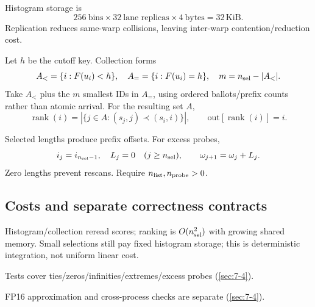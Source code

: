 Histogram storage is
\[
 256\ \text{bins}\times32\ \text{lane replicas}\times4\ \text{bytes}=32\,\mathrm{KiB}.
\]
Replication reduces same-warp collisions, leaving inter-warp contention/reduction cost.

Let $h$ be the cutoff key. Collection forms
\[
 A_< =\{i:F(u_i)<h\},\quad A_= =\{i:F(u_i)=h\},\quad
 m=n_{\rm sel}-|A_<|.
\]
Take $A_<$ plus the $m$ smallest IDs in $A_=$, using ordered ballots/prefix counts rather than atomic arrival. For the resulting set $A$,
\[
 \operatorname{rank}(i)=|\{j\in A:(s_j,j)\prec(s_i,i)\}|,
 \qquad\mathrm{out}[\operatorname{rank}(i)]=i.
\]

Selected lengths produce prefix offsets. For excess probes,
\[
 i_j=i_{n_{\rm sel}-1},\quad L_j=0\quad(j\geq n_{\rm sel}),
 \qquad\omega_{j+1}=\omega_j+L_j.
\]
Zero lengths prevent rescans. Require $n_{\rm list},n_{\rm probe}>0$.

\subsection{Costs and separate correctness contracts}

Histogram/collection reread scores; ranking is $O(n_{\rm sel}^2)$ with growing shared memory. Small selections still pay fixed histogram storage; this is deterministic integration, not uniform linear cost.

Tests cover ties/zeros/infinities/extremes/excess probes (\cref{sec:7-4}).

FP16 approximation and cross-process checks are separate (\cref{sec:7-4}).